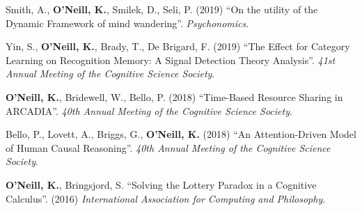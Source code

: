 Smith, A., \textbf{O'Neill, K.}, Smilek, D., Seli, P. (2019) ``On the
utility of the Dynamic Framework of mind
wandering''. \emph{Psychonomics}.

Yin, S., \textbf{O'Neill, K.}, Brady, T., De Brigard, F. (2019) ``The
Effect for Category Learning on Recognition Memory: A Signal Detection
Theory Analysis''. \emph{41st Annual Meeting of the Cognitive Science
Society}.

\textbf{O'Neill, K.}, Bridewell, W., Bello, P. (2018) ``Time-Based
Resource Sharing in ARCADIA''. \emph{40th Annual Meeting of the
  Cognitive Science Society}.

Bello, P., Lovett, A., Briggs, G., \textbf{O'Neill, K.} (2018) ``An
Attention-Driven Model of Human Causal Reasoning''. \emph{40th Annual
Meeting of the Cognitive Science Society}.
  
\textbf{O’Neill, K.}, Bringsjord, S. ``Solving the Lottery Paradox in a
Cognitive Calculus''. (2016) \emph{International Association for
Computing and Philosophy}.
